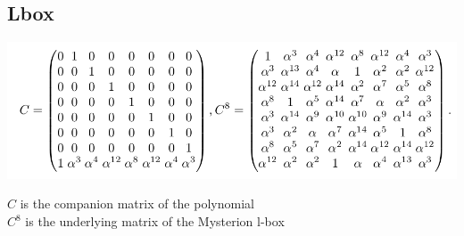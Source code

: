 \documentclass[preprint]{transcrypto}
\begin{document}
\subsection{Lbox}
\begin{center}
    \includegraphics[scale=0.33]{l-box.png}\\
    
\end{center}
\begin{center}
    $C$ is the companion matrix of the polynomial\\
    $C^{8}$ is the underlying matrix of the Mysterion l-box
\end{center}
\end{document}
